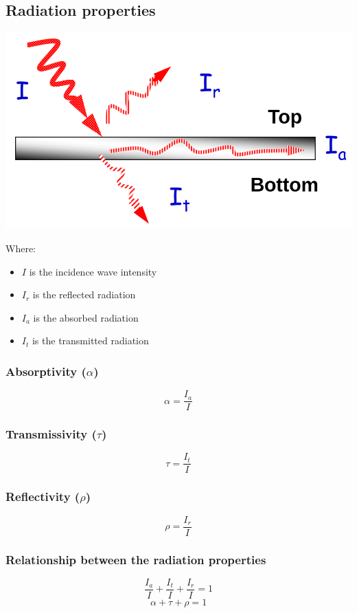 \documentclass[11pt]{article}
\begin{document}
\subsection{Radiation properties}
\label{sec:org3708591}
\begin{center}
\includegraphics[width=.9\linewidth]{./images/radiation-properties.png}
\end{center}

Where:
\begin{itemize}
\item \(I\) is the incidence wave intensity
\item \(I_r\) is the reflected radiation
\item \(I_a\) is the absorbed radiation
\item \(I_t\) is the transmitted radiation
\end{itemize}
\subsubsection{Absorptivity (\(\alpha\))}
\label{sec:org1e97237}
\[\alpha = \frac{I_a}{I}\]
\subsubsection{Transmissivity (\(\tau\))}
\label{sec:orgd89afaf}
\[\tau = \frac{I_t}{I}\]
\subsubsection{Reflectivity (\(\rho\))}
\label{sec:orgf325746}
\[\rho = \frac{I_r}{I}\]
\subsubsection{Relationship between the radiation properties}
\label{sec:orgcd669e7}
\[\frac{I_a}{I} + \frac{I_t}{I} + \frac{I_r}{I} = 1\]
\[\alpha + \tau + \rho = 1\]
\end{document}
